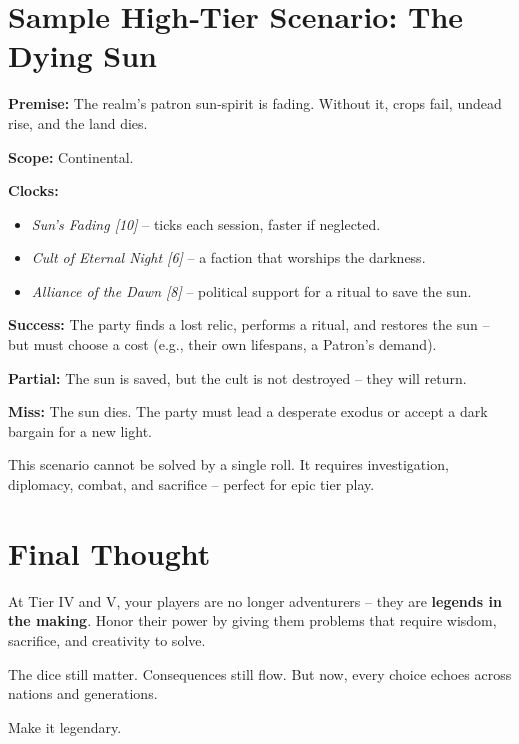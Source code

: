 \section{Sample High‑Tier Scenario: The Dying Sun}

\textbf{Premise:} The realm’s patron sun‑spirit is fading. Without it, crops fail, undead rise, and the land dies.

\textbf{Scope:} Continental.

\textbf{Clocks:}
\begin{itemize}
  \item \emph{Sun’s Fading [10]} – ticks each session, faster if neglected.
  \item \emph{Cult of Eternal Night [6]} – a faction that worships the darkness.
  \item \emph{Alliance of the Dawn [8]} – political support for a ritual to save the sun.
\end{itemize}

\textbf{Success:} The party finds a lost relic, performs a ritual, and restores the sun – but must choose a cost (e.g., their own lifespans, a Patron’s demand).

\textbf{Partial:} The sun is saved, but the cult is not destroyed – they will return.

\textbf{Miss:} The sun dies. The party must lead a desperate exodus or accept a dark bargain for a new light.

This scenario cannot be solved by a single roll. It requires investigation, diplomacy, combat, and sacrifice – perfect for epic tier play.

\section{Final Thought}

At Tier IV and V, your players are no longer adventurers – they are \textbf{legends in the making}. Honor their power by giving them problems that require wisdom, sacrifice, and creativity to solve.

The dice still matter. Consequences still flow. But now, every choice echoes across nations and generations.

Make it legendary.